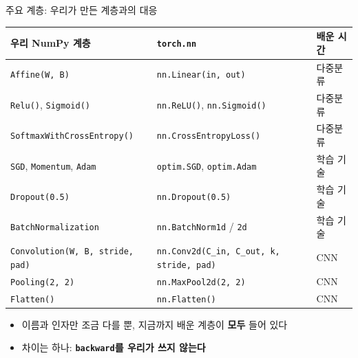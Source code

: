 \documentclass[aspectratio=169,11pt]{beamer}
\newcommand{\code}[1]{\texttt{#1}}
\begin{document}
\begin{frame}{주요 계층: 우리가 만든 계층과의 대응}
\centering
\footnotesize
\renewcommand{\arraystretch}{1.15}
\begin{tabular}{lll}
\toprule
\textbf{우리 NumPy 계층} & \textbf{\code{torch.nn}} & \textbf{배운 시간} \\
\midrule
\code{Affine(W, B)} & \code{nn.Linear(in, out)} & 다중분류 \\
\code{Relu()}, \code{Sigmoid()} & \code{nn.ReLU()}, \code{nn.Sigmoid()} & 다중분류 \\
\code{SoftmaxWithCrossEntropy()} & \code{nn.CrossEntropyLoss()} & 다중분류 \\
\code{SGD}, \code{Momentum}, \code{Adam} & \code{optim.SGD}, \code{optim.Adam} & 학습 기술 \\
\code{Dropout(0.5)} & \code{nn.Dropout(0.5)} & 학습 기술 \\
\code{BatchNormalization} & \code{nn.BatchNorm1d} / \code{2d} & 학습 기술 \\
\code{Convolution(W, B, stride, pad)} & \code{nn.Conv2d(C\_in, C\_out, k, stride, pad)} & CNN \\
\code{Pooling(2, 2)} & \code{nn.MaxPool2d(2, 2)} & CNN \\
\code{Flatten()} & \code{nn.Flatten()} & CNN \\
\bottomrule
\end{tabular}
\vskip3mm
\raggedright
\begin{itemize}
\item 이름과 인자만 조금 다를 뿐, 지금까지 배운 계층이 \textbf{모두} 들어 있다
\item 차이는 하나: \textbf{\code{backward}를 우리가 쓰지 않는다}
\end{itemize}
\end{frame}
\end{document}
